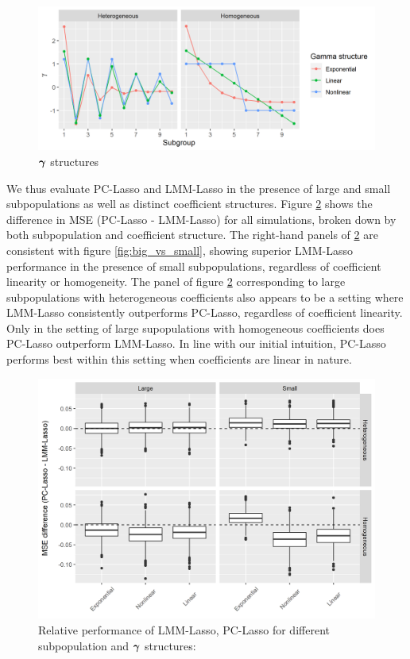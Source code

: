 \begin{figure}[H]
    \centering
    \includegraphics[scale = 0.9]{figures/gamma_structure.png}
    \caption{$\boldsymbol{\gamma}$ structures}
    \label{fig:gamma_structures}
\end{figure}

We thus evaluate PC-Lasso and LMM-Lasso in the presence of large and small subpopulations as well as distinct coefficient structures. Figure \ref{fig:big_small_gamma} shows the difference in MSE (PC-Lasso - LMM-Lasso) for all simulations, broken down by both subpopulation and coefficient structure. The right-hand panels of \ref{fig:big_small_gamma} are consistent with figure \ref{fig:big_vs_small}, showing superior LMM-Lasso performance in the presence of small subpopulations, regardless of coefficient linearity or homogeneity. The panel of figure \ref{fig:big_small_gamma} corresponding to large subpopulations with heterogeneous coefficients also appears to be a setting where LMM-Lasso consistently outperforms PC-Lasso, regardless of coefficient linearity. Only in the setting of large supopulations with homogeneous coefficients does PC-Lasso outperform LMM-Lasso. In line with our initial intuition, PC-Lasso performs best within this setting when coefficients are linear in nature. 

\begin{figure}[H]
    \centering
    \includegraphics[scale = 0.9]{figures/mse_diff_hetero.png}
    \caption{Relative performance of LMM-Lasso, PC-Lasso for different subpopulation and $\boldsymbol{\gamma}$ structures: }
    \label{fig:big_small_gamma}
\end{figure}

